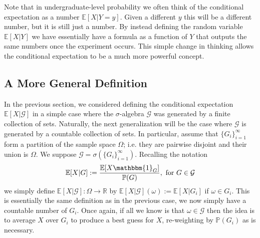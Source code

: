 \documentclass[12pt]{article}
\newcommand{\E}{\mathbb{E}}
\newcommand{\R}{\mathbb{R}}
\newcommand{\Prob}{\mathbb{P}}
\begin{document}
Note that in undergraduate-level probability we often think of the conditional expectation as a number $\E[X|Y = y]$. Given a different $y$ this will be a different number, but it  is still just a number. By instead defining the 
random variable $\E[X|Y]$ we have essentially have a formula as a function of $Y$ that outputs the same numbers once the experiment occurs. This simple change in thinking allows the conditional expectation to be a much 
more powerful concept. 

\subsection{A More General Definition}
In the previous section, we considered defining the conditional expectation $\E[X|\mathcal{G}]$ in a simple case where the $\sigma$-algebra $\mathcal{G}$ was generated by a finite collection of sets. Naturally, the next 
generalization will be the case where $\mathcal{G}$ is generated by a countable collection of sets. In particular, assume that $\{G_i\}_{i = 1}^{\infty}$ form a partition of the sample space $\Omega$; i.e. they are 
pairwise disjoint and their union is $\Omega$. We suppose $\mathcal{G} = \sigma\left(\{G_i\}_{i = 1}^{\infty}\right)$. Recalling the notation 
\[\E[X|G] := \frac{\E[X\mathbbm{1}_G]}{\Prob(G)}, \text{ for } G \in \mathcal{G}\]
we simply define $\E[X|\mathcal{G}]: \Omega \to \R$ by $\E[X|\mathcal{G}](\omega) := \E[X|G_i]$ if $\omega \in G_i$. This is essentially the same definition as in the previous case, we now simply have a countable 
number of $G_i$. Once again, if all we know is that $\omega \in \mathcal{G}$ then the idea is to average $X$ over $G_i$ to produce a best guess for $X$, re-weighting by $\Prob(G_i)$ as is necessary.
\end{document}
